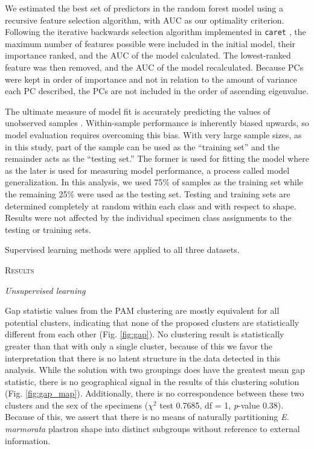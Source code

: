 \documentclass[12pt,letterpaper]{article}
\renewcommand{\section}[1]{%
\bigskip
\begin{center}
\begin{Large}
\normalfont\scshape #1
\medskip
\end{Large}
\end{center}}
\renewcommand{\subsection}[1]{%
\bigskip
\begin{center}
\begin{large}
\normalfont\itshape #1
\end{large}
\end{center}}
\begin{document}
We estimated the best set of predictors in the random forest model using a recursive feature selection algorithm, with AUC as our optimality criterion. Following the iterative backwards selection algorithm implemented in \texttt{caret} \citep{KuhnMAN2013}, the maximum number of features possible were included in the initial model, their importance ranked, and the AUC of the model calculated. The lowest-ranked feature was then removed, and the AUC of the model recalculated. Because PCs were kept in order of importance and not in relation to the amount of variance each PC described, the PCs are not included in the order of ascending eigenvalue.

The ultimate measure of model fit is accurately predicting the values of unobserved samples \citep{Hastie2009,Kuhn2013}. Within-sample performance is inherently biased upwards, so model evaluation requires overcoming this bias. With very large sample sizes, as in this study, part of the sample can be used as the ``training set'' and the remainder acts as the ``testing set.'' The former is used for fitting the model where as the later is used for measuring model performance, a process called model generalization. In this analysis, we used 75\% of samples as the training set while the remaining 25\% were used as the testing set. Testing and training sets are determined completely at random within each class and with respect to shape. Results were not affected by the individual specimen class assignments to the testing or training sets.

Supervised learning methods were applied to all three datasets.


\section{Results}

\subsection{Unsupervised learning}

Gap statistic values from the PAM clustering are mostly equivalent for all potential clusters, indicating that none of the proposed clusters are statistically different from each other (Fig. \ref{fig:gap}). No clustering result is statistically greater than that with only a single cluster, because of this we favor the interpretation that there is no latent structure in the data detected in this analysis. While the solution with two groupings does have the greatest mean gap statistic, there is no geographical signal in the results of this clustering solution (Fig. \ref{fig:gap_map}). Additionally, there is no correspondence between these two clusters and the sex of the specimens (\(\chi^{2}\) test 0.7685, df = 1, \textit{p}-value 0.38). Because of this, we assert that there is no means of naturally partitioning \textit{E. marmorata} plastron shape into distinct subgroups without reference to external information. 
\end{document}
